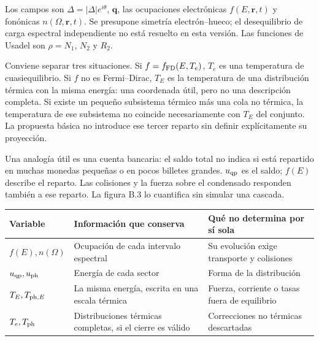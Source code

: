 \documentclass[
  spanish,
  10pt,
  a4paper,
]{article}
\newcounter{none} %
\begin{document}
Los campos son \(\Delta=|\Delta| e^{i\theta}\), \(\mathbf q\), las
ocupaciones electrónicas \(f(E,\mathbf r,t)\) y fonónicas
\(n(\Omega,\mathbf r,t)\). Se presupone simetría electrón--hueco; el
desequilibrio de carga espectral independiente no está resuelto en esta
versión. Las funciones de Usadel son \(\rho=N_1\), \(N_2\) y \(R_2\).

Conviene separar tres situaciones. Si \(f=f_{\rm FD}(E,T_e)\), \(T_e\)
es una temperatura de cuasiequilibrio. Si \(f\) no es Fermi--Dirac,
\(T_E\) es la temperatura de una distribución térmica con la misma
energía: una coordenada útil, pero no una descripción completa. Si
existe un pequeño subsistema térmico más una cola no térmica, la
temperatura de ese subsistema no coincide necesariamente con \(T_E\) del
conjunto. La propuesta básica no introduce ese tercer reparto sin
definir explícitamente su proyección.

Una analogía útil es una cuenta bancaria: el saldo total no indica si
está repartido en muchas monedas pequeñas o en pocos billetes grandes.
\(u_{\rm qp}\) es el saldo; \(f(E)\) describe el reparto. Las colisiones
y la fuerza sobre el condensado responden también a ese reparto. La
figura B.3 lo cuantifica sin simular una cascada.

{\def\LTcaptype{none} %
\begin{longtable}[]{@{}
  >{\raggedright\arraybackslash}p{}
  >{\raggedright\arraybackslash}p{}
  >{\raggedright\arraybackslash}p{}@{}}
\toprule\noalign{}
\begin{minipage}[b]{\linewidth}\raggedright
Variable
\end{minipage} & \begin{minipage}[b]{\linewidth}\raggedright
Información que conserva
\end{minipage} & \begin{minipage}[b]{\linewidth}\raggedright
Qué no determina por sí sola
\end{minipage} \\
\midrule\noalign{}
\endhead
\bottomrule\noalign{}
\endlastfoot
\(f(E),n(\Omega)\) & Ocupación de cada intervalo espectral & Su
evolución exige transporte y colisiones \\
\(u_{\rm qp},u_{\rm ph}\) & Energía de cada sector & Forma de la
distribución \\
\(T_E,T_{{\rm ph},E}\) & La misma energía, escrita en una escala térmica
& Fuerza, corriente o tasas fuera de equilibrio \\
\(T_e,T_{\rm ph}\) & Distribuciones térmicas completas, si el cierre es
válido & Correcciones no térmicas descartadas \\
\end{longtable}
}
\end{document}
